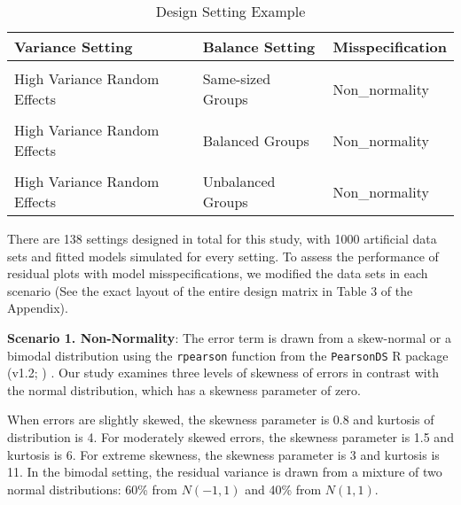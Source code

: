 \documentclass[12pt]{article}
\begin{document}
\vspace{-8pt}

\begin{table}[H]

\caption{\label{tab:example_design}Design Setting Example}
\centering
\fontsize{8}{10}\selectfont
\begin{tabular}[t]{lll}
\toprule
Variance Setting & Balance Setting & Misspecification\\
\midrule
\cellcolor{gray!6}{High Variance Error} & \cellcolor{gray!6}{Same-sized Groups} & \cellcolor{gray!6}{Non\_normality}\\
High Variance Random Effects & Same-sized Groups & Non\_normality\\
\cellcolor{gray!6}{High Variance Error} & \cellcolor{gray!6}{Balanced Groups} & \cellcolor{gray!6}{Non\_normality}\\
High Variance Random Effects & Balanced Groups & Non\_normality\\
\cellcolor{gray!6}{High Variance Error} & \cellcolor{gray!6}{Unbalanced Groups} & \cellcolor{gray!6}{Non\_normality}\\
\addlinespace
High Variance Random Effects & Unbalanced Groups & Non\_normality\\
\bottomrule
\end{tabular}
\end{table}

\vspace{-3pt}

There are 138 settings designed in total for this study, with 1000
artificial data sets and fitted models simulated for every setting. To
assess the performance of residual plots with model misspecifications,
we modified the data sets in each scenario (See the exact layout of the
entire design matrix in Table 3 of the Appendix).

\textbf{Scenario 1. Non-Normality}: The error term is drawn from a
skew-normal or a bimodal distribution using the \texttt{rpearson}
function from the \texttt{PearsonDS} R package (v1.2;
\citep{becker2021}) . Our study examines three levels of skewness of
errors in contrast with the normal distribution, which has a skewness
parameter of zero.

When errors are slightly skewed, the skewness parameter is 0.8 and
kurtosis of distribution is 4. For moderately skewed errors, the
skewness parameter is 1.5 and kurtosis is 6. For extreme skewness, the
skewness parameter is 3 and kurtosis is 11. In the bimodal setting, the
residual variance is drawn from a mixture of two normal distributions:
60\% from \(N(-1,1)\) and 40\% from \(N(1,1)\).
\end{document}
